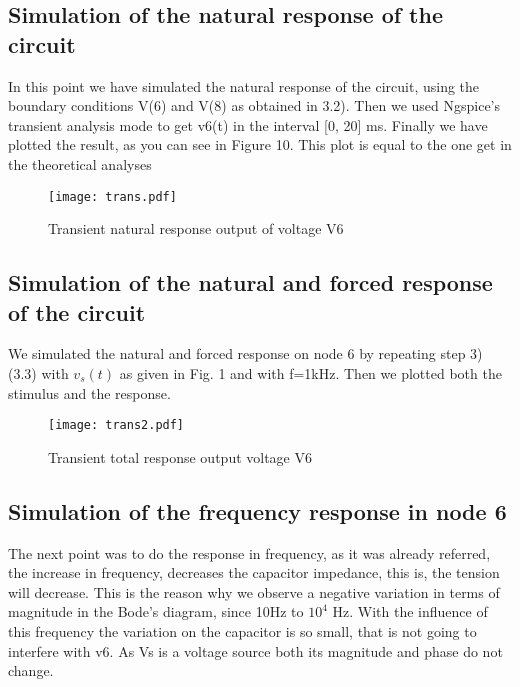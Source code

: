 \newpage

\subsection{Simulation of the natural response of the circuit}

In this point we have simulated the natural response of the circuit, using the boundary conditions V(6) and V(8) as obtained in 3.2). Then we used Ngspice’s transient analysis mode to get v6(t) in the interval [0, 20] ms. Finally we have plotted the result, as you can see in Figure 10. This plot is equal to the one get in the theoretical analyses
\vspace{-0.9in}
\begin{figure}[H] \centering
\texttt{[image: trans.pdf]}
\caption{Transient natural response output of voltage V6}
\label{fig:trans}
\end{figure}



\subsection{Simulation of the natural and forced response of the circuit}


We simulated the natural and forced response on node 6 by repeating step  3) (3.3) with $v_s(t)$ as given in Fig. 1 and with f=1kHz. Then we plotted both the stimulus and the response.
\vspace{-1.2in}
\begin{figure}[H] \centering
\texttt{[image: trans2.pdf]}
\caption{Transient total response output voltage V6}
\label{fig:trans2}
\end{figure}



\subsection{Simulation of the frequency response in node 6 } 

The next point was to do the response in frequency, as it was already referred, the increase in frequency, decreases the capacitor impedance, this is, the tension will decrease. This is the reason why we observe a negative variation in terms of magnitude in the Bode's diagram, since 10Hz to $10^4$ Hz. With the influence of this frequency the variation on the capacitor is so small, that is not going to interfere with v6. As Vs is a voltage source both its magnitude and phase do not change.

